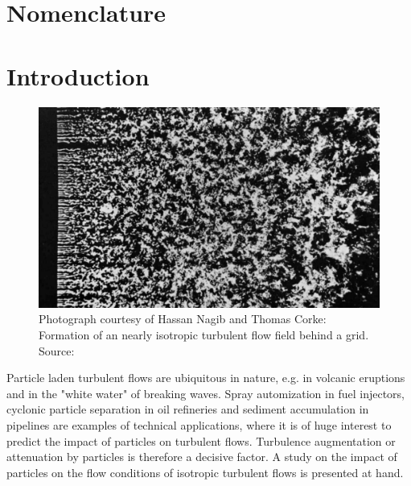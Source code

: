 \documentclass[11pt,a4paper,openany,oneside,parskip=half*]{article}
\begin{document}
\makenomenclature %


\renewcommand{\refname}{}
\renewcommand{\nomname}{}



\setlength{\columnsep}{30pt}
\setlength{\parindent}{0pt}

\pagebreak

\tableofcontents{} %
 
\pagebreak

\section{Nomenclature}
\printnomenclature
\pagebreak
\section{Introduction}
\begin{figure}[h]
	\centering
  \includegraphics[width=\textwidth]{./Abbildungen/TurbulentMotion_Introduction.png}
	\caption{Photograph courtesy of Hassan Nagib and Thomas Corke: Formation of an nearly isotropic turbulent flow field behind a grid. Source: \cite{albumOfFluidMotion}}
	\label{introduction_picture}
\end{figure}
Particle laden turbulent flows are ubiquitous in nature, e.g. in volcanic eruptions and in the "white water" of breaking waves.
Spray automization in fuel injectors, cyclonic particle separation in oil refineries and sediment accumulation in pipelines are examples of technical applications, where it is of huge interest to predict the impact of particles on turbulent flows.
Turbulence augmentation or attenuation by particles is therefore a decisive factor.
\newline
A study on the impact of particles on the flow conditions of isotropic turbulent flows is presented at hand.
\end{document}
